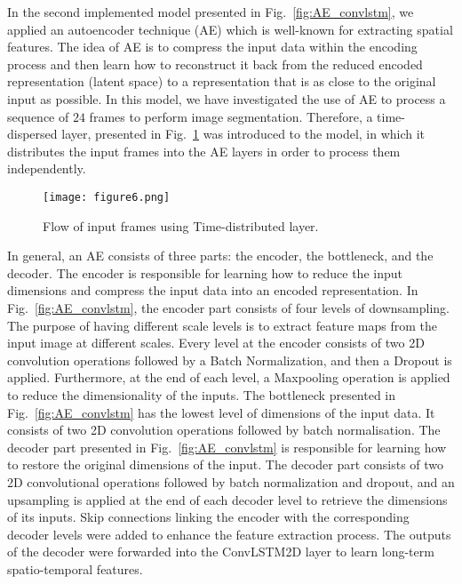 \begin{sloppypar}
	In the second implemented model presented in Fig.~\ref{fig:AE_convlstm}, we applied an autoencoder technique (AE) which is well-known for extracting spatial features.
	The idea of AE is to compress the input data within the encoding process and then learn how to reconstruct it back from the reduced encoded representation (latent space) to a representation that is as close to the original input as possible. 
	In this model, we have investigated the use of AE to process a sequence of \(24\) frames to perform image segmentation.
	Therefore, a time-dispersed layer, presented in Fig.~\ref{fig:TD} was introduced to the model, in which it distributes the input frames into the AE layers in order to process them independently.
	\begin{figure}[!ht]
		\centering
		\texttt{[image: figure6.png]}
		\caption{Flow of input frames using Time-distributed layer.}
		\label{fig:TD}
	\end{figure}
	
	In general, an AE consists of three parts: the encoder, the bottleneck, and the decoder.
	The encoder is responsible for learning how to reduce the input dimensions and compress the input data into an encoded representation.
	In Fig.~\ref{fig:AE_convlstm}, the encoder part consists of four levels of downsampling. 
	The purpose of having different scale levels is to extract feature maps from the input image at different scales.
	Every level at the encoder consists of two 2D convolution operations followed by a Batch Normalization, and then a Dropout is applied.
	Furthermore, at the end of each level, a Maxpooling operation is applied to reduce the dimensionality of the inputs. 
	The bottleneck presented in Fig.~\ref{fig:AE_convlstm} has the lowest level of dimensions of the input data.
	It consists of two 2D convolution operations followed by batch normalisation.
	The decoder part presented in Fig.~\ref{fig:AE_convlstm} is responsible for learning how to restore the original dimensions of the input.
	The decoder part consists of two 2D convolutional operations followed by batch normalization and dropout, and an upsampling is applied at the end of each decoder level to retrieve the dimensions of its inputs.
	Skip connections linking the encoder with the corresponding decoder levels were added to enhance the feature extraction process.
	The outputs of the decoder were forwarded into the ConvLSTM2D layer to learn long-term spatio-temporal features.
	

\end{sloppypar}
